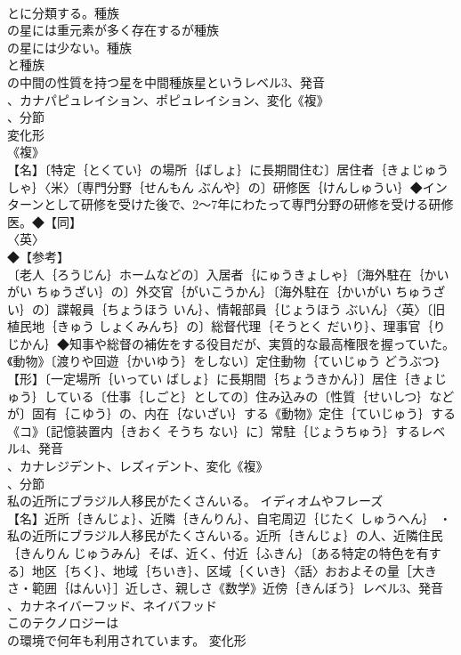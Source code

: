\documentclass[8pt]{extreport}
\begin{document}
\begin{CJK}{UTF8}{min}
\\	とに分類する。種族
\\	の星には重元素が多く存在するが種族
\\	の星には少ない。種族
\\	と種族
\\	の中間の性質を持つ星を中間種族星というレベル3、発音
\\	、カナパピュレイション、ポピュレイション、変化《複》
\\	、分節
\\	変化形 
\\	《複》
\\	【名】〔特定｛とくてい｝の場所｛ばしょ｝に長期間住む〕居住者｛きょじゅうしゃ｝〈米〉〔専門分野｛せんもん ぶんや｝の〕研修医｛けんしゅうい｝◆インターンとして研修を受けた後で、2～7年にわたって専門分野の研修を受ける研修医。◆【同】
\\	〈英〉
\\	◆【参考】
\\	〔老人｛ろうじん｝ホームなどの〕入居者｛にゅうきょしゃ｝〔海外駐在｛かいがい ちゅうざい｝の〕外交官｛がいこうかん｝〔海外駐在｛かいがい ちゅうざい｝の〕諜報員｛ちょうほう いん｝、情報部員｛じょうほう ぶいん｝〈英〉〔旧植民地｛きゅう しょくみんち｝の〕総督代理｛そうとく だいり｝、理事官｛りじかん｝◆知事や総督の補佐をする役目だが、実質的な最高権限を握っていた。《動物》〔渡りや回遊｛かいゆう｝をしない〕定住動物｛ていじゅう どうぶつ｝【形】〔一定場所｛いってい ばしょ｝に長期間｛ちょうきかん｝〕居住｛きょじゅう｝している〔仕事｛しごと｝としての〕住み込みの〔性質｛せいしつ｝などが〕固有｛こゆう｝の、内在｛ないざい｝する《動物》定住｛ていじゅう｝する《コ》〔記憶装置内｛きおく そうち ない｝に〕常駐｛じょうちゅう｝するレベル4、発音
\\	、カナレジデント、レズィデント、変化《複》
\\	、分節
\\	私の近所にブラジル人移民がたくさんいる。	イディオムやフレーズ 
\\	【名】近所｛きんじょ｝、近隣｛きんりん｝、自宅周辺｛じたく しゅうへん｝ ・
\\	私の近所にブラジル人移民がたくさんいる。近所｛きんじょ｝の人、近隣住民｛きんりん じゅうみん｝そば、近く、付近｛ふきん｝〔ある特定の特色を有する〕地区｛ちく｝、地域｛ちいき｝、区域｛くいき｝〈話〉おおよその量［大きさ・範囲｛はんい｝］近しさ、親しさ《数学》近傍｛きんぼう｝レベル3、発音
\\	、カナネイバーフッド、ネイバフッド
\\	このテクノロジーは
\\	の環境で何年も利用されています。	変化形 

\end{CJK}
\end{document}
